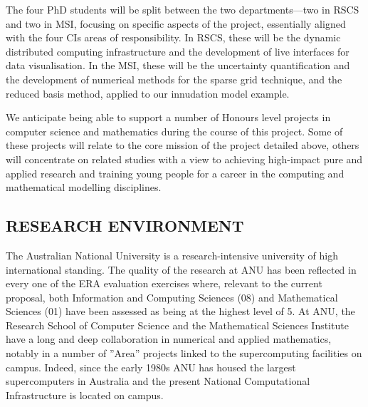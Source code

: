 \documentclass[a4paper,fontsize=12pt]{scrartcl}
\begin{document}
The four  PhD students will be split between the two departments---two
in RSCS and two in MSI, focusing on specific aspects of the project, essentially aligned 
with the four CIs areas of responsibility. 
In RSCS, these will be the dynamic distributed computing
infrastructure and the development of live interfaces for data
visualisation. In the MSI, these will be the uncertainty
quantification and the development of numerical methods for the sparse
grid technique, and the reduced basis method, applied to our innudation model example. 

We anticipate being able to support a number of Honours level projects in computer science and mathematics during the course of this project. Some of these projects will relate to the core mission of the project detailed above, others will concentrate on related studies with a view to achieving high-impact pure and applied research and training young people for a career in the computing and mathematical modelling disciplines.

\subsection*{RESEARCH ENVIRONMENT}

The Australian National University is a research-intensive university
of high international standing. The quality of the research at ANU has
been reflected in every one of the ERA evaluation exercises where,
relevant to the current proposal, both Information and Computing
Sciences (08) and Mathematical Sciences (01) have been assessed as
being at the highest level of 5. At ANU, the Research School of
Computer Science and the Mathematical Sciences Institute have a long
and deep collaboration in numerical and applied mathematics, notably
in a number of ''Area'' projects linked to the supercomputing
facilities on campus. Indeed, since the early 1980s ANU has housed the
largest supercomputers in Australia and the present National
Computational Infrastructure is located on campus.
\end{document}

